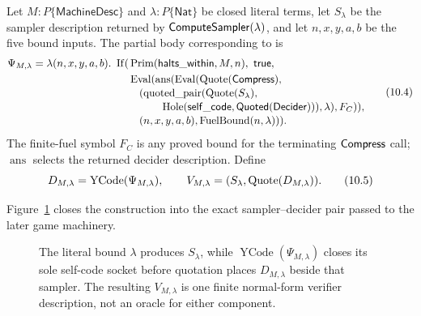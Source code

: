 Let \(M:P\{\mathsf{MachineDesc}\}\) and
\(\lambda:P\{\mathsf{Nat}\}\) be closed literal terms, let \(S_\lambda\) be the sampler
description returned by \(\mathsf{ComputeSampler}(\lambda)\), and let \(n,x,y,a,b\) be the
five bound inputs.  The partial body corresponding to  is
\[
\begin{split}
 \Psi_{M,\lambda}=\lambda(n,x,y,a,b).\ \operatorname{If}(&
  \operatorname{Prim}(\mathsf{halts\_within},M,n),\ \mathsf{true},\\
 &\operatorname{Eval}(
   \operatorname{ans}(\operatorname{Eval}(
      \operatorname{Quote}(\mathsf{Compress}),\\[-2pt]
 &\quad (\operatorname{quoted\_pair}(\operatorname{Quote}(S_\lambda),\\[-2pt]
 &\qquad\quad \operatorname{Hole}(\mathsf{self\_code},
          \mathsf{Quoted}(\mathsf{Decider}))),\lambda),F_C)),\\[-2pt]
 &\quad(n,x,y,a,b),\operatorname{FuelBound}(n,\lambda))).
\end{split}
\tag{10.4}\label{eq:psi-ml}
\]
The finite-fuel symbol \(F_C\) is any proved bound for the terminating
\(\mathsf{Compress}\) call; \(\operatorname{ans}\) selects the returned decider
description.  Define
\[
 D_{M,\lambda}=\operatorname{YCode}(\Psi_{M,\lambda}),\qquad
 V_{M,\lambda}=(S_\lambda,\operatorname{Quote}(D_{M,\lambda})).
\tag{10.5}\label{eq:dml}
\]

Figure~\ref{fig:C-closed-verifier} closes the construction into the exact
sampler--decider pair passed to the later game machinery.
\begin{figure}[H]
\centering

\caption{The literal bound \(\lambda\) produces \(S_\lambda\), while \(\operatorname{YCode}(\Psi_{M,\lambda})\) closes its sole self-code socket before quotation places \(D_{M,\lambda}\) beside that sampler.  The resulting \(V_{M,\lambda}\) is one finite normal-form verifier description, not an oracle for either component.}
\label{fig:C-closed-verifier}
\end{figure}

